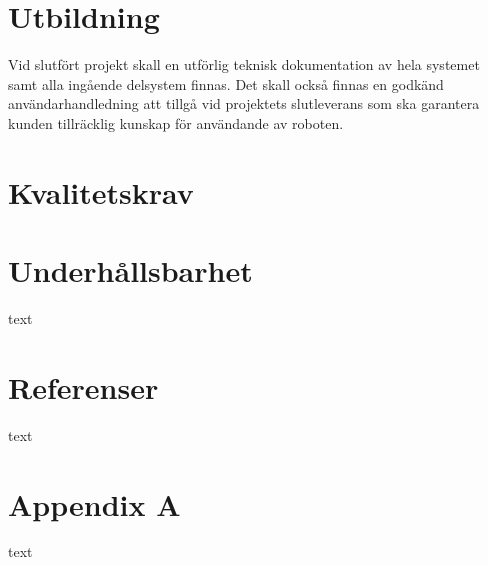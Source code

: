 \documentclass[11pt]{article}
\begin{document}
\begin{flushleft}
\begin{center}
\begin{longtable}{|p{.24\linewidth}|p{.08\linewidth}|p{.25\linewidth}|p{.19\linewidth}|p{.1\linewidth}|}
\end {longtable}
\end {center}

\section{Utbildning}
Vid slutfört projekt skall en utförlig teknisk dokumentation av hela systemet samt alla ingående delsystem finnas. Det skall också finnas en godkänd användarhandledning att tillgå vid projektets slutleverans som ska garantera kunden tillräcklig kunskap för användande av roboten.


\section{Kvalitetskrav}



\section{Underhållsbarhet}
text

\setcounter{secnumdepth}{0}
\section{Referenser}
text
\setcounter{secnumdepth}{2}

\pagebreak

\section{Appendix A}
text



\end{flushleft}
\end{document}
